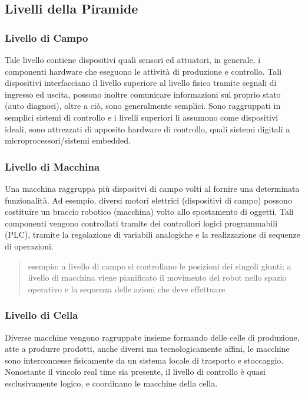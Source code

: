 \documentclass[10pt, letterpaper]{report}
\begin{document}
\subsection{Livelli della Piramide}
\subsubsection{Livello di Campo}
Tale livello contiene dispositivi quali sensori ed attuatori, in generale,  i componenti hardware che 
eseguono le attività di produzione e controllo. Tali dispositivi interfacciano il livello superiore al livello 
fisico tramite segnali di ingresso ed uscita, possono inoltre comunicare informazioni sul proprio 
stato (auto diagnosi), oltre a ciò, sono generalmente semplici.\acc 
Sono raggruppati in semplici sistemi di controllo e i livelli superiori li assumono come dispositivi 
ideali, sono attrezzati di apposito hardware di controllo, quali sistemi digitali a microprocessori/sistemi 
embedded.
\subsubsection{Livello di Macchina}
Una macchina raggruppa più dispositvi di campo volti al fornire una determinata funzionalità. Ad esempio, 
diversi motori elettrici (dispositivi di campo) possono costituire un braccio robotico (macchina) volto allo 
spostamento di oggetti.\acc 
Tali componenti vengono controllati tramite dei controllori logici programmabili (PLC), tramite la regolazione 
di variabili analogiche e la realizzazione di sequenze di operazioni.\begin{quote}
    \color{gray}
    esempio: a livello di campo si controllano le posizioni dei singoli giunti; a livello di macchina 
viene pianificato il movimento del robot nello spazio operativo e la sequenza delle azioni che 
deve effettuare
\color{black}\end{quote}
\subsubsection{Livello di Cella}
Diverse macchine vengono ragruppate insieme formando delle celle di produzione, atte a produrre prodotti, anche 
diversi ma tecnologicamente affini, le macchine sono interconnesse fisicamente da un sistema locale di trasporto 
e stoccaggio. Nonostante il vincolo real time sia presente, il livello di controllo è quasi 
esclusivamente logico, e coordinano le macchine della cella. 
\end{document}

